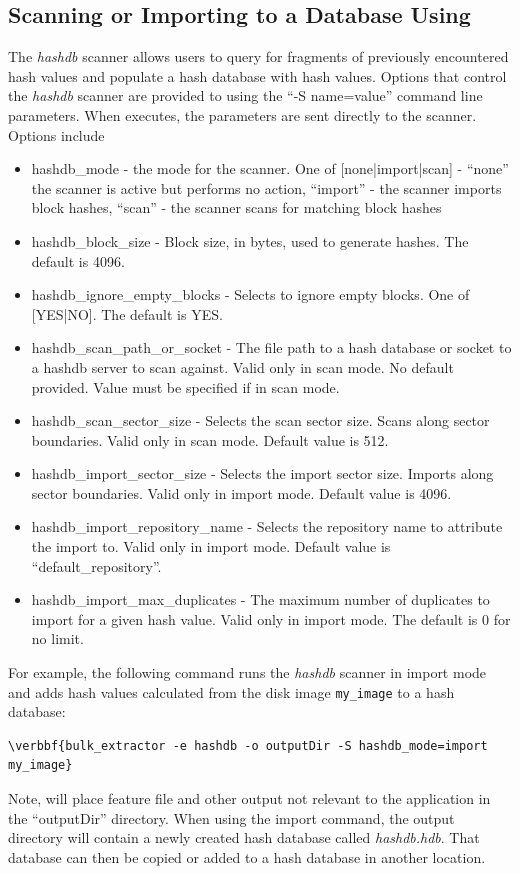 \documentclass[11pt,fleqn]{article} %
\begin{document}
\subsection{Scanning or Importing to a Database Using \bulk}
\label{bulkextractorSection}
The \bulk \textit{hashdb} scanner allows users to query for fragments of previously encountered hash values and populate a hash database with hash values. Options that control the \textit{hashdb} scanner are provided to \bulk using the ``-S name=value'' command line parameters. When \bulk executes, the parameters are sent directly to the scanner. Options include
\begin{itemize}
\item hashdb\_mode - the mode for the scanner. One of [none|import|scan] - ``none'' the scanner is active but performs no action, ``import'' - the scanner imports block hashes, ``scan'' - the scanner scans for matching block hashes
\item hashdb\_block\_size - Block size, in bytes, used to generate hashes. The default is 4096.
\item hashdb\_ignore\_empty\_blocks - Selects to ignore empty blocks.  One of [YES|NO].  The default is YES.
\item hashdb\_scan\_path\_or\_socket - The file path to a hash database or
    socket to a hashdb server to scan against.  Valid only in scan mode. No default provided. Value must be specified if in scan mode.
\item hashdb\_scan\_sector\_size - Selects the scan sector size.  Scans along sector boundaries.
      Valid only in scan mode. Default value is 512.
\item hashdb\_import\_sector\_size - Selects the import sector size.  Imports along sector boundaries.
      Valid only in import mode. Default value is 4096.
\item hashdb\_import\_repository\_name - Selects the repository name to attribute the import to.
      Valid only in import mode. Default value is ``default\_repository''.
\item hashdb\_import\_max\_duplicates - The maximum number of duplicates to import
    for a given hash value.  Valid only in import mode. The default is 0 for no limit.
\end{itemize}

For example, the following command runs the \bulk \textit{hashdb} scanner in import mode and adds hash values calculated from the disk image \texttt{my\_image} to a hash database:
\begin{Verbatim}[commandchars=\\\{\}]
\verbbf{bulk_extractor -e hashdb -o outputDir -S hashdb_mode=import my_image}
\end{Verbatim}
Note, \bulk will place feature file and other output not relevant to the \hash application in the ``outputDir'' directory. When using the import command, the output directory will contain a newly created hash database called \textit{hashdb.hdb}. That database can then be copied or added to a hash database in another location.
\end{document}
